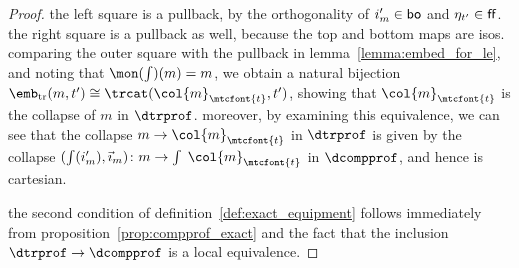 \documentclass[11pt,oneside,article]{memoir}
\begin{document}
\begin{proof}

   the left square is a pullback, by the orthogonality of $i'_m\in\mathsf{bo}$ and $\eta_{t'}\in\mathsf{ff}$.
   the right square is a pullback as well, because the top and bottom maps are isos. comparing the outer square with the pullback in lemma~\ref{lemma:embed_for_le}, and noting that $\mon(\int)(m)=m$, we obtain a natural bijection
   $\emb_{\mathrm{tr}}(m,t')\iso\trcat(\col{m}_{\mtcfont{t}},t')$, showing that $\col{m}_{\mtcfont{t}}$ is the collapse of
   $m$ in $\dtrprof$. moreover, by examining this equivalence, we can see that the collapse $m\to
   \col{m}_{\mtcfont{t}}$ in $\dtrprof$ is given by the collapse $(\int(i'_m),\vec{\imath}_m)\colon m\to\int\;\col{m}_{\mtcfont{t}}$ in
   $\dcompprof$, and hence is cartesian.

   the second condition of definition~\ref{def:exact_equipment} follows immediately from proposition~\ref{prop:compprof_exact} and the fact that the inclusion $\dtrprof\to\dcompprof$ is a local equivalence.
\end{proof}
\end{document}
